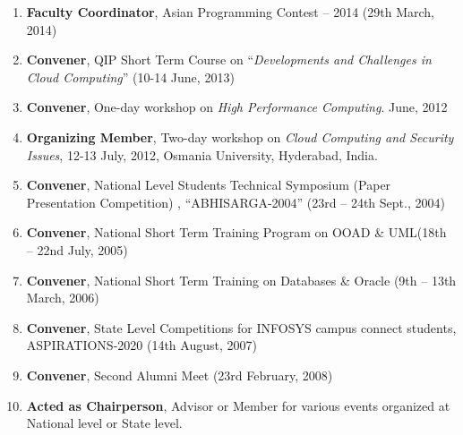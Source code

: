 \begin{enumerate}
\item
\textbf{Faculty Coordinator}, Asian Programming Contest – 2014 (29th March, 2014)

\item
\textbf{Convener}, QIP Short Term Course on “\textit{Developments and Challenges in Cloud Computing}” (10-14 June, 2013)

\item
\textbf{Convener}, One-day workshop on\textit{ High Performance Computing}. June, 2012

\item
\textbf{Organizing Member}, Two-day workshop on\textit{ Cloud Computing and Security Issues}, 12-13 July, 2012, Osmania University, Hyderabad, India.

\item
\textbf{Convener}, National Level Students Technical Symposium (Paper Presentation Competition) , “ABHISARGA-2004” (23rd – 24th Sept., 2004) 

\item
\textbf{Convener}, National Short Term Training Program on OOAD \& UML(18th – 22nd July, 2005) 

\item
\textbf{Convener}, National Short Term Training on Databases \& Oracle (9th – 13th March, 2006) 

\item
\textbf{Convener}, State Level Competitions for INFOSYS campus connect students, ASPIRATIONS-2020 (14th August, 2007) 

\item
\textbf{Convener}, Second Alumni Meet (23rd February, 2008) 

\item
\textbf{Acted as Chairperson}, Advisor or Member for various events organized at National level or State level.

\end{enumerate}